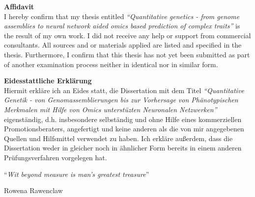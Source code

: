 \documentclass[
12pt, %
english, %
doublespacing, %
headsepline, %
chapterinoneline, %
]{MastersDoctoralThesis} %
\begin{document}

\begin{declaration}
  \noindent
  {\LARGE\textbf{Affidavit}} \\
  \noindent
  I hereby confirm that my thesis entitled \textit{``Quantitative genetics -
  from genome assemblies to neural network aided omics based
  prediction of complex traits''} is the result of my own work. I did not
  receive any help or support from commercial consultants. All sources
  and  or materials applied are listed and specified in the thesis.
  Furthermore, I confirm that this thesis has not yet been submitted
  as part of another examination process neither in identical nor in
  similar form.

  \vspace{0.1\textheight}
  \noindent
  {\LARGE\textbf{Eidesstattliche Erkl\"{a}rung}}\\
  \noindent
  Hiermit erkläre ich an Eides statt, die Dissertation mit dem Titel \textit{``Quantitative Genetik - von Genomassemblierungen bis zur Vorhersage von Ph\"{a}notypischen Merkmalen mit Hilfe von Omics unterstüzten Neuronalen Netzwerken''} 
  eigenst\"{a}ndig, d.h. insbesondere selbst\"{a}ndig und ohne Hilfe eines
  kommerziellen Promotionsberaters, angefertigt und keine anderen als
  die von mir angegebenen Quellen und Hilfsmittel verwendet zu haben.
  Ich erkl\"{a}re außerdem, dass die Dissertation weder in gleicher noch
  in \"{a}hnlicher Form bereits in einem anderen Pr\"{u}fungsverfahren
  vorgelegen hat.
\end{declaration}
\newpage



\vspace*{0.2\textheight}

\noindent\enquote{\itshape Wit beyond measure is man's greatest treasure}\bigbreak

\hfill Rowena Rawenclaw

\end{document}
